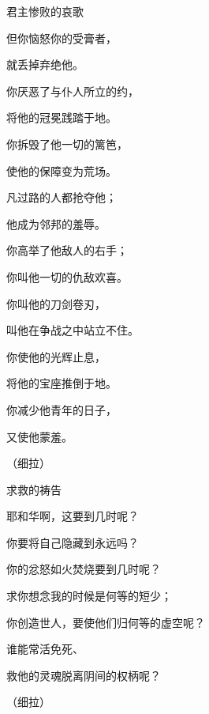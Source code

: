 {\SH 君主惨败的哀歌
\par }{\Q {}但你恼怒你的受膏者，
\par }{\Q 就丢掉弃绝他。
\par }{\Q {}你厌恶了与仆人所立的约，
\par }{\Q 将他的冠冕践踏于地。
\par }{\Q {}你拆毁了他一切的篱笆，
\par }{\Q 使他的保障变为荒场。
\par }{\Q {}凡过路的人都抢夺他；
\par }{\Q 他成为邻邦的羞辱。
\par }{\Q {}你高举了他敌人的右手；
\par }{\Q 你叫他一切的仇敌欢喜。
\par }{\Q {}你叫他的刀剑卷刃，
\par }{\Q 叫他在争战之中站立不住。
\par }{\Q {}你使他的光辉止息，
\par }{\Q 将他的宝座推倒于地。
\par }{\Q {}你减少他青年的日子，
\par }{\Q 又使他蒙羞。
\par }{\QS （细拉）
\par }
{\SH 求救的祷告
\par }{\Q {}耶和华啊，这要到几时呢？
\par }{\Q 你要将自己隐藏到永远吗？
\par }{\Q 你的忿怒如火焚烧要到几时呢？
\par }{\Q {}求你想念我的时候是何等的短少；
\par }{\Q 你创造世人，要使他们归何等的虚空呢？
\par }{\Q {}谁能常活免死、
\par }{\Q 救他的灵魂脱离阴间的权柄呢？
\par }{\QS （细拉）
\par }
